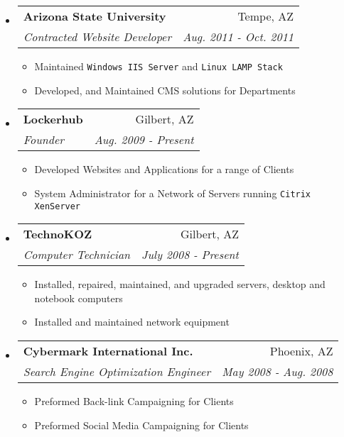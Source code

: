 \documentclass[letterpaper,11pt]{article}
\makeatletter
\newcommand{\resitem}[1]{\item #1 \vspace{-2pt}}
\newcommand{\ressubheading}[4]{

\begin{tabular*}{6.5in}{l@{\cftdotfill{\cftsecdotsep}\extracolsep{\fill}}r}

		\textbf{#1} & #2 \\

		\textit{#3} & \textit{#4} \\

\end{tabular*}\vspace{-6pt}}
\makeatother
\begin{document}
\begin{itemize}

\item

	\ressubheading{Arizona State University}{Tempe, AZ}{Contracted Website Developer}{Aug. 2011 - Oct. 2011}

	\begin{itemize}

		\resitem{Maintained \texttt{Windows IIS Server} and \texttt{Linux LAMP Stack}}

    		\resitem{Developed, and Maintained CMS solutions for Departments}

	\end{itemize}

\item

	\ressubheading{Lockerhub}{Gilbert, AZ}{Founder}{Aug. 2009 - Present}

	\begin{itemize}

		\resitem{Developed Websites and Applications for a range of Clients}

  		 \resitem{System Administrator for a Network of Servers running  \texttt{Citrix XenServer} }

	\end{itemize}

\item 

	\ressubheading{TechnoKOZ}{Gilbert, AZ}{Computer Technician}{July 2008 - Present}

	\begin{itemize}

		\resitem{Installed, repaired, maintained, and upgraded servers, desktop and notebook computers}

 		 \resitem{Installed and maintained network equipment}

	\end{itemize}

\item

	\ressubheading{Cybermark International Inc.}{Phoenix, AZ}{Search Engine Optimization Engineer}{May 2008 - Aug. 2008}

	\begin{itemize}

		\resitem{Preformed Back-link Campaigning for Clients}
		\resitem{Preformed Social Media Campaigning for Clients}

	\end{itemize}
	
\end{itemize}
\end{document}
